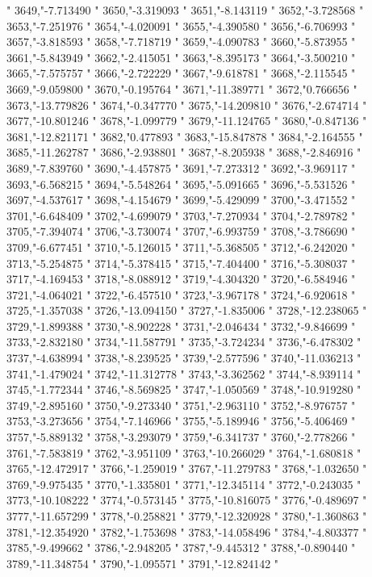 "
3649,"-7.713490
"
3650,"-3.319093
"
3651,"-8.143119
"
3652,"-3.728568
"
3653,"-7.251976
"
3654,"-4.020091
"
3655,"-4.390580
"
3656,"-6.706993
"
3657,"-3.818593
"
3658,"-7.718719
"
3659,"-4.090783
"
3660,"-5.873955
"
3661,"-5.843949
"
3662,"-2.415051
"
3663,"-8.395173
"
3664,"-3.500210
"
3665,"-7.575757
"
3666,"-2.722229
"
3667,"-9.618781
"
3668,"-2.115545
"
3669,"-9.059800
"
3670,"-0.195764
"
3671,"-11.389771
"
3672,"0.766656
"
3673,"-13.779826
"
3674,"-0.347770
"
3675,"-14.209810
"
3676,"-2.674714
"
3677,"-10.801246
"
3678,"-1.099779
"
3679,"-11.124765
"
3680,"-0.847136
"
3681,"-12.821171
"
3682,"0.477893
"
3683,"-15.847878
"
3684,"-2.164555
"
3685,"-11.262787
"
3686,"-2.938801
"
3687,"-8.205938
"
3688,"-2.846916
"
3689,"-7.839760
"
3690,"-4.457875
"
3691,"-7.273312
"
3692,"-3.969117
"
3693,"-6.568215
"
3694,"-5.548264
"
3695,"-5.091665
"
3696,"-5.531526
"
3697,"-4.537617
"
3698,"-4.154679
"
3699,"-5.429099
"
3700,"-3.471552
"
3701,"-6.648409
"
3702,"-4.699079
"
3703,"-7.270934
"
3704,"-2.789782
"
3705,"-7.394074
"
3706,"-3.730074
"
3707,"-6.993759
"
3708,"-3.786690
"
3709,"-6.677451
"
3710,"-5.126015
"
3711,"-5.368505
"
3712,"-6.242020
"
3713,"-5.254875
"
3714,"-5.378415
"
3715,"-7.404400
"
3716,"-5.308037
"
3717,"-4.169453
"
3718,"-8.088912
"
3719,"-4.304320
"
3720,"-6.584946
"
3721,"-4.064021
"
3722,"-6.457510
"
3723,"-3.967178
"
3724,"-6.920618
"
3725,"-1.357038
"
3726,"-13.094150
"
3727,"-1.835006
"
3728,"-12.238065
"
3729,"-1.899388
"
3730,"-8.902228
"
3731,"-2.046434
"
3732,"-9.846699
"
3733,"-2.832180
"
3734,"-11.587791
"
3735,"-3.724234
"
3736,"-6.478302
"
3737,"-4.638994
"
3738,"-8.239525
"
3739,"-2.577596
"
3740,"-11.036213
"
3741,"-1.479024
"
3742,"-11.312778
"
3743,"-3.362562
"
3744,"-8.939114
"
3745,"-1.772344
"
3746,"-8.569825
"
3747,"-1.050569
"
3748,"-10.919280
"
3749,"-2.895160
"
3750,"-9.273340
"
3751,"-2.963110
"
3752,"-8.976757
"
3753,"-3.273656
"
3754,"-7.146966
"
3755,"-5.189946
"
3756,"-5.406469
"
3757,"-5.889132
"
3758,"-3.293079
"
3759,"-6.341737
"
3760,"-2.778266
"
3761,"-7.583819
"
3762,"-3.951109
"
3763,"-10.266029
"
3764,"-1.680818
"
3765,"-12.472917
"
3766,"-1.259019
"
3767,"-11.279783
"
3768,"-1.032650
"
3769,"-9.975435
"
3770,"-1.335801
"
3771,"-12.345114
"
3772,"-0.243035
"
3773,"-10.108222
"
3774,"-0.573145
"
3775,"-10.816075
"
3776,"-0.489697
"
3777,"-11.657299
"
3778,"-0.258821
"
3779,"-12.320928
"
3780,"-1.360863
"
3781,"-12.354920
"
3782,"-1.753698
"
3783,"-14.058496
"
3784,"-4.803377
"
3785,"-9.499662
"
3786,"-2.948205
"
3787,"-9.445312
"
3788,"-0.890440
"
3789,"-11.348754
"
3790,"-1.095571
"
3791,"-12.824142
"
